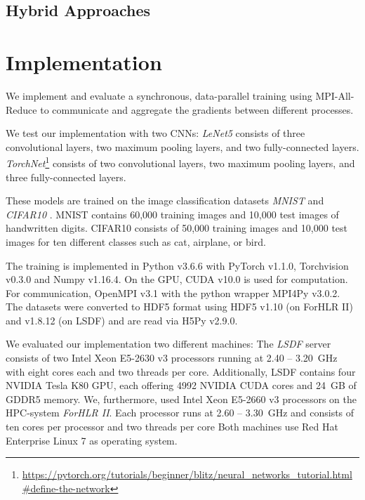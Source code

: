 \documentclass[conference,compsoc,a4paper]{IEEEtran}
\begin{document}

\subsection{Hybrid Approaches} %
\label{sub:hybrid_approaches}





\section{Implementation} %
\label{sec:implementation}
We implement and evaluate a synchronous, data-parallel training using MPI-All-Reduce to communicate and aggregate the gradients between different processes.

We test our implementation with two CNNs:
\emph{LeNet5} \cite{lecun1998gradient} consists of three convolutional layers, two maximum pooling layers, and two fully-connected layers.
\emph{TorchNet}\footnote{\url{https://pytorch.org/tutorials/beginner/blitz/neural_networks_tutorial.html\#define-the-network}} consists of two convolutional layers, two maximum pooling layers, and three fully-connected layers.

These models are trained on the image classification datasets \emph{MNIST} \cite{lecun1998gradient} and \emph{CIFAR10} \cite{krizhevsky2009CIFAR10}.
MNIST contains 60,000 training images and 10,000 test images of handwritten digits.
CIFAR10 consists of 50,000 training images and 10,000 test images for ten different classes such as cat, airplane, or bird.

The training is implemented in Python v3.6.6 with PyTorch v1.1.0, Torchvision v0.3.0 and Numpy v1.16.4.
On the GPU, CUDA v10.0 is used for computation.
For communication, OpenMPI v3.1 with the python wrapper MPI4Py v3.0.2.
The datasets were converted to HDF5 format using HDF5 v1.10 (on ForHLR II) and v1.8.12 (on LSDF) and are read via H5Py v2.9.0.

We evaluated our implementation two different machines:
The \emph{LSDF} server consists of two Intel Xeon E5-2630 v3 processors running at 2.40 – 3.20~GHz with eight cores each and two threads per core.
Additionally, LSDF contains four NVIDIA Tesla K80 GPU, each offering 4992 NVIDIA CUDA cores and 24~GB of GDDR5 memory.
%
We, furthermore, used Intel Xeon E5-2660 v3 processors on the HPC-system \emph{ForHLR II}. %
Each processor runs at 2.60 – 3.30~GHz and consists of ten cores per processor and two threads per core
%
Both machines use Red Hat Enterprise Linux 7 as operating system.
\end{document}
